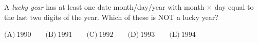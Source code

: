 A \emph{lucky year} has at least one date month/day/year with month $\times$ day equal to the last two digits of the year. Which of these is NOT a lucky year?

$\text{(A)}\ 1990\qquad\text{(B)}\ 1991\qquad\text{(C)}\ 1992\qquad\text{(D)}\ 1993\qquad\text{(E)}\ 1994$
